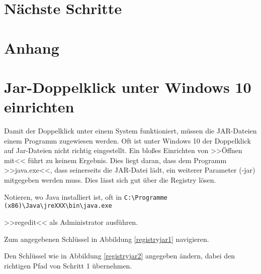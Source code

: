 \documentclass[12pt]{scrartcl}
\begin{document}
\section{Nächste Schritte}

\section*{Anhang}
\appendix
\section{Jar-Doppelklick unter Windows 10 einrichten}
Damit der Doppelklick unter einem System funktioniert, müssen die JAR-Dateien einem Programm zugewiesen werden. Oft ist unter Windows 10 der Doppelklick auf Jar-Dateien nicht richtig eingestellt. Ein bloßes Einrichten von >>Öffnen mit<< führt zu keinem Ergebnis. Dies liegt daran, dass dem Programm >>java.exe<<, dass seinerseits die JAR-Datei lädt, ein weiterer Parameter (-jar) mitgegeben werden muss. Dies lässt sich gut über die Registry lösen.

\begin{compactenum}
\item Notieren, wo Java installiert ist, oft in \verb+C:\Programme (x86)\Java\jreXXX\bin\java.exe+
\item >>regedit<< als Administrator ausführen.
\item Zum angegebenen Schlüssel in Abbildung \ref{registryjar1} navigieren.
\item Den Schlüssel wie in Abbildung \ref{registryjar2} angegeben ändern, dabei den richtigen Pfad von Schritt 1 übernehmen.
\end{compactenum}

\end{document}
